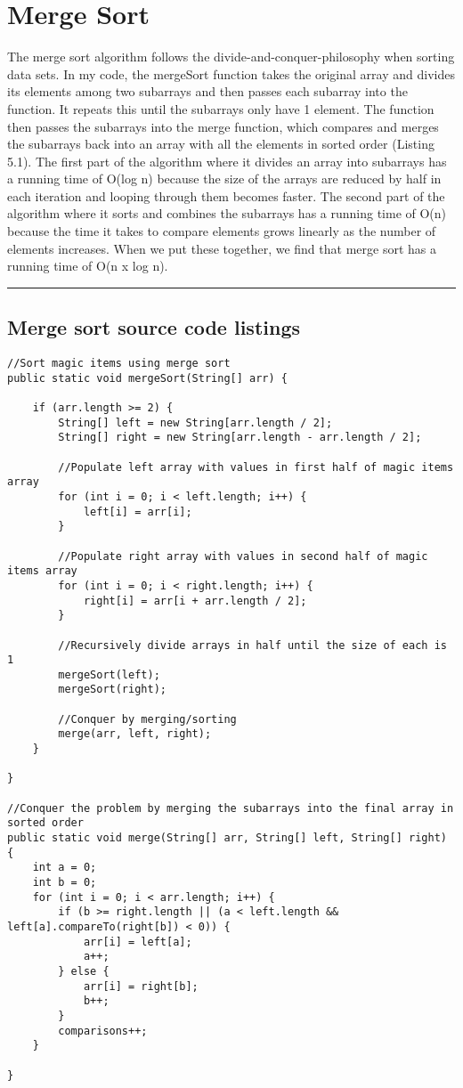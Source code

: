 \documentclass[letterpaper, 10pt,DIV=13]{scrartcl}
\numberwithin{equation}{section} %
\numberwithin{figure}{section} %
\numberwithin{table}{section} %
\newcommand{\horrule}[1]{\rule{\linewidth}{#1}} %
\begin{document}
\section{Merge Sort}\label{operations}
The merge sort algorithm follows the divide-and-conquer-philosophy when sorting data sets. In my code, the mergeSort function takes the original array and divides its elements among two subarrays and then passes each subarray into the function. It repeats this until the subarrays only have 1 element. The function then passes the subarrays into the merge function, which compares and merges the subarrays back into an array with all the elements in sorted order (Listing 5.1). The first part of the algorithm where it divides an array into subarrays has a running time of O(log n) because the size of the arrays are reduced by half in each iteration and looping through them becomes faster. The second part of the algorithm where it sorts and combines the subarrays has a running time of O(n) because the time it takes to compare elements grows linearly as the number of elements increases. When we put these together, we find that merge sort has a running time of O(n x log n).

\horrule{0pt}  	%

\subsection{Merge sort source code listings}
\lstset{numbers=left, numberstyle=\tiny, stepnumber=1, numbersep=5pt, basicstyle=\footnotesize\ttfamily}
\begin{lstlisting}[frame=single, ] 
//Sort magic items using merge sort
public static void mergeSort(String[] arr) {
    
    if (arr.length >= 2) {
        String[] left = new String[arr.length / 2];
        String[] right = new String[arr.length - arr.length / 2];

        //Populate left array with values in first half of magic items array
        for (int i = 0; i < left.length; i++) {
            left[i] = arr[i];
        }

        //Populate right array with values in second half of magic items array
        for (int i = 0; i < right.length; i++) {
            right[i] = arr[i + arr.length / 2];
        }

        //Recursively divide arrays in half until the size of each is 1
        mergeSort(left);
        mergeSort(right);

        //Conquer by merging/sorting
        merge(arr, left, right);
    }

}

//Conquer the problem by merging the subarrays into the final array in sorted order
public static void merge(String[] arr, String[] left, String[] right) {
    int a = 0;
    int b = 0;
    for (int i = 0; i < arr.length; i++) {
        if (b >= right.length || (a < left.length && left[a].compareTo(right[b]) < 0)) {
            arr[i] = left[a];
            a++;
        } else {
            arr[i] = right[b];
            b++;
        }
        comparisons++;
    }

}
\end{lstlisting}
\end{document}
